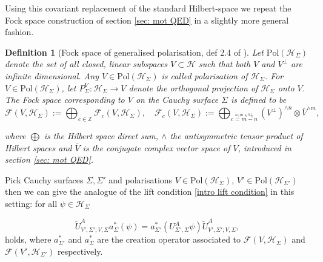 \documentclass[b5paper,draft,openbib,12pt]{memoir}
\newtheorem{Def}{Definition}
\begin{document}
Using this covariant replacement of the standard Hilbert-space we 
repeat the Fock space construction of section \ref{sec: mot QED} 
in a slightly more general fashion.

\begin{Def}[Fock space of generalised polarisation, def 2.4 of \cite{deckert2016perspective}]
  Let \(\text{Pol} (\mathcal{H}_\Sigma)\) denote the set of all 
  closed, linear subspaces \(V\subset \mathcal{H}\)
  such that both \(V\) and \(V^\perp\) are infinite dimensional. 
  Any \(V\in \text{Pol}(\mathcal{H}_\Sigma)\) is called 
  \emph{polarisation} of \(\mathcal{H}_\Sigma\). For 
  \(V\in \text{Pol}(\mathcal{H}_\Sigma)\), let 
  \(P_\Sigma^V:\mathcal{H}_{\Sigma}\rightarrow V\) 
  denote the orthogonal projection of \(\mathcal{H}_\Sigma\) onto 
  \(V\).
  The Fock space corresponding to \(V\) on the Cauchy surface 
  \(\Sigma\) is defined to be
  \begin{equation}
  \mathcal{F}(V,\mathcal{H}_\Sigma) := \bigoplus_{c\in\mathbb{Z}} \mathcal{F}_c (V,\mathcal{H}_\Sigma), \quad 
  \mathcal{F}_c(V,\mathcal{H}_\Sigma):= \bigoplus_{\overset{n,m\in\mathbb{N}_0}{c=m-n}}(V^\perp)^{\wedge n} \otimes \overline{V}^{\wedge m},
  \end{equation}
  
  where \(\bigoplus\) is the Hilbert space direct sum, \(\wedge\) 
  the antisymmetric tensor product of Hilbert spaces and 
  \(\overline{V}\) is the conjugate complex vector space of 
  \(V\), introduced in section \ref{sec: mot QED}.
\end{Def}

Pick Cauchy surfaces \(\Sigma, \Sigma'\) and polarisations 
\(V\in \text{Pol}(\mathcal{H}_\Sigma) \),
\(V'\in \text{Pol}(\mathcal{H}_{\Sigma'}) \)
then we can 
give the analogue of the lift condition  
\eqref{intro lift condition} in 
this setting: for all \(\psi \in \mathcal{H}_{\Sigma}\)

\begin{equation}\label{lift condition}
  \tilde{U}^A_{V',\Sigma'; V,\Sigma} a_\Sigma^*(\psi)
  =a^*_{\Sigma'}(U^A_{\Sigma',\Sigma}\psi )\tilde{U}^A_{V',\Sigma';V,\Sigma},\tag{lift condition}
\end{equation}
holds, where \(a^*_{\Sigma'}\) and \(a^*_{\Sigma}\) are the 
creation operator associated to 
\(\mathcal{F}(V,\mathcal{H}_{\Sigma})\) and 
\(\mathcal{F}(V',\mathcal{H}_{\Sigma'})\) respectively. 
\end{document}
